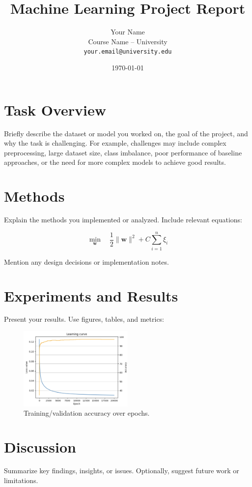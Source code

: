 \documentclass[11pt]{article}
\title{\textbf{Machine Learning Project Report}}
\author{Your Name \\
Course Name – University \\
\texttt{your.email@university.edu}}
\date{\today}
\begin{document}
\maketitle

\section{Task Overview}
Briefly describe the dataset or model you worked on, the goal of the project, and why the task is challenging. For example, challenges may include complex preprocessing, large dataset size, class imbalance, poor performance of baseline approaches, or the need for more complex models to achieve good results.

\section{Methods}
Explain the methods you implemented or analyzed. Include relevant equations:

\[
\min_{\mathbf{w}} \quad \frac{1}{2} \|\mathbf{w}\|^2 + C \sum_{i=1}^n \xi_i
\]

Mention any design decisions or implementation notes.

\section{Experiments and Results}
Present your results. Use figures, tables, and metrics:

\begin{figure}[h]
    \centering
    \includegraphics[width=0.5\textwidth]{ML_Project_Report_Template/figures/accuracy_curve.png}
    \caption{Training/validation accuracy over epochs.}
\end{figure}

\section{Discussion}
Summarize key findings, insights, or issues. Optionally, suggest future work or limitations.
\end{document}
